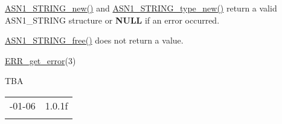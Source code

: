 \documentclass[]{article}
\let\realtextbf=\textbf
\renewcommand{\textbf}[1]{\textcolor{boldcolor}{\realtextbf{#1}}}
\renewcommand{\emph}[1]{\underline{#1}}
\begin{document}

\emph{ASN1\_STRING\_new()} and \emph{ASN1\_STRING\_type\_new()} return a
valid ASN1\_STRING structure or \textbf{NULL} if an error occurred.

\emph{ASN1\_STRING\_free()} does not return a value.


\emph{ERR\_get\_error}(3)


TBA

\begin{longtable}[c]{@{}ll@{}}
\toprule\addlinespace
2014-01-06 & 1.0.1f
\\\addlinespace
\bottomrule
\end{longtable}
\end{document}
